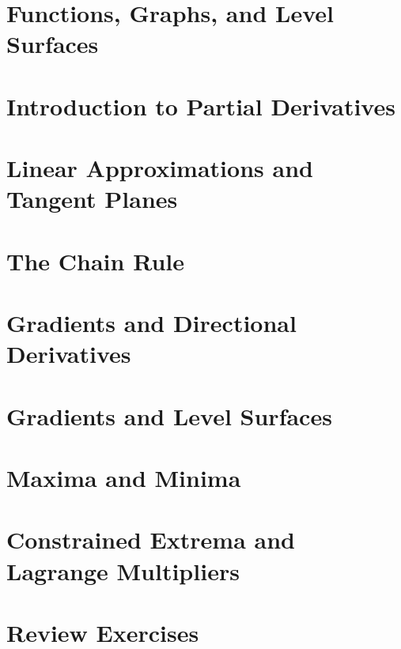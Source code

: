 \documentclass[a4paper, 11pt]{article}
\begin{document}
\maketitle
\thispagestyle{firstpage}

\tableofcontents
\newpage

\section{Functions, Graphs, and Level Surfaces}


\section{Introduction to Partial Derivatives}


\section{Linear Approximations and Tangent Planes}


\section{The Chain Rule}


\section{Gradients and Directional Derivatives}


\section{Gradients and Level Surfaces}


\section{Maxima and Minima}


\section{Constrained Extrema and Lagrange Multipliers}


\section{Review Exercises}

\end{document}
